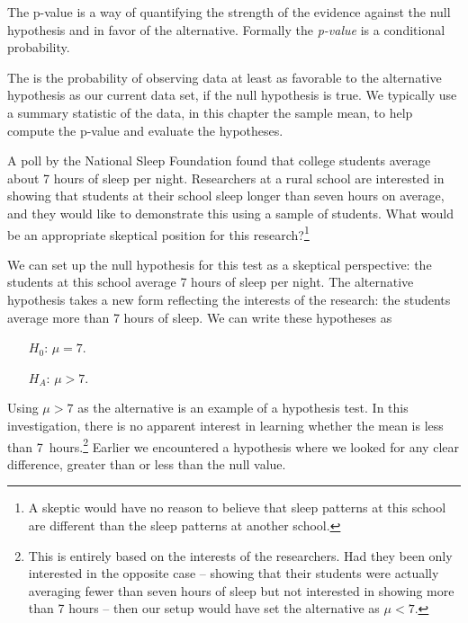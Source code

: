 
The p-value is a way of quantifying the strength of the evidence against the null hypothesis and in favor of the alternative. Formally the \emph{p-value} is a conditional probability.

\begin{termBox}{
The  is the probability of observing data at least as favorable to the alternative hypothesis as our current data set, if the null hypothesis is true. We typically use a summary statistic of the data, in this chapter the sample mean, to help compute the p-value and evaluate the hypotheses.}
\end{termBox}



\begin{exercise} \label{skepticalPerspOfRuralSchoolSleepExercise}
A poll by the National Sleep Foundation found that college students average about 7 hours of sleep per night. Researchers at a rural school are interested in showing that students at their school sleep longer than seven hours on average, and they would like to demonstrate this using a sample of students. What would be an appropriate skeptical position for this research?\footnote{A skeptic would have no reason to believe that sleep patterns at this school are different than the sleep patterns at another school.}
\end{exercise}

We can set up the null hypothesis for this test as a skeptical perspective: the students at this school average 7 hours of sleep per night. The alternative hypothesis takes a new form reflecting the interests of the research: the students average more than 7 hours of sleep. We can write these hypotheses as
\begin{itemize}
\setlength{\itemsep}{0mm}
\item[$H_0$:] $\mu = 7$.
\item[$H_A$:] $\mu > 7$.
\end{itemize}
Using $\mu > 7$ as the alternative is an example of a  hypothesis test. In this investigation, there is no apparent interest in learning whether the mean is less than 7~hours.\footnote{This is entirely based on the interests of the researchers. Had they been only interested in the opposite case -- showing that their students were actually averaging fewer than seven hours of sleep but not interested in showing more than 7 hours -- then our setup would have set the alternative as $\mu < 7$.} Earlier we encountered a  hypothesis where we looked for any clear difference, greater than or less than the null value.

